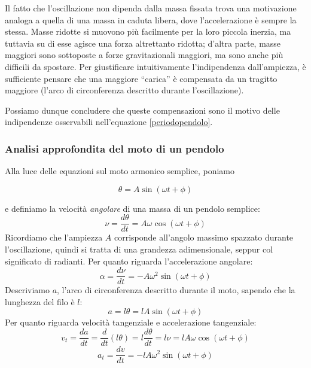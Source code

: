 Il fatto che l'oscillazione non dipenda dalla massa fissata trova una
motivazione analoga a quella di una massa in caduta libera, dove
l'accelerazione è sempre la stessa. Masse ridotte si muovono più
facilmente per la loro piccola inerzia, ma tuttavia su di esse agisce
una forza altrettanto ridotta; d'altra parte, masse maggiori sono
sottoposte a forze gravitazionali maggiori, ma sono anche più difficili
da spostare.
Per giustificare intuitivamente l'indipendenza dall'ampiezza, è
sufficiente pensare che una maggiore ``carica'' è compensata da un
tragitto maggiore (l'arco di circonferenza descritto durante
l'oscillazione).

Possiamo dunque concludere che queste compensazioni sono il motivo
delle indipendenze osservabili nell'equazione \ref{periodopendolo}.

\subsubsection*{Analisi approfondita del moto di un pendolo}
Alla luce delle equazioni sul moto armonico semplice, poniamo

\[ \theta = A \sin(\omega t + \phi) \]

\noindent e definiamo la
velocità \textit{angolare} di una massa di un pendolo semplice:
\[ \nu = \frac{d\theta}{dt} = A\omega\cos(\omega t + \phi) \]
Ricordiamo che l'ampiezza $A$ corrisponde all'angolo massimo spazzato
durante l'oscillazione, quindi si tratta di una grandezza adimensionale,
seppur col significato di radianti. Per quanto riguarda l'accelerazione
angolare:
\[ \alpha = \frac{d\nu}{dt} = -A\omega^2\sin(\omega t + \phi) \]
Descriviamo $a$, l'arco di circonferenza descritto durante il moto,
sapendo che la lunghezza del filo è $l$:
\[ a = l\theta = lA\sin(\omega t + \phi) \]
Per quanto riguarda velocità tangenziale e accelerazione tangenziale:
\[ v_t = \frac{da}{dt} = \frac{d}{dt}(l\theta) = l\frac{d\theta}{dt} = l\nu = lA\omega\cos(\omega t + \phi) \]
\[ a_t = \frac{dv}{dt} = -lA\omega^2\sin(\omega t + \phi) \]


